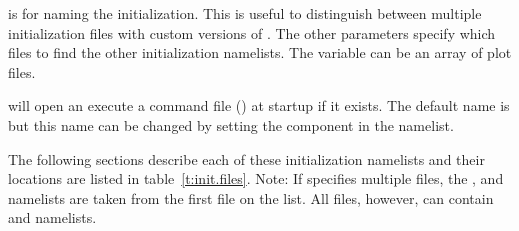  is for naming the initialization. This is useful to distinguish between multiple
initialization files with custom versions of \tao. The other parameters specify which files to find
the other initialization namelists. The  variable can be an array of plot files.

\tao will open an execute a command file () at startup if it exists.  The
default name is  but this name can be changed by setting the 
component in the  namelist.

The following sections describe each of these initialization namelists and their locations are
listed in table~\ref{t:init.files}. Note: If  specifies multiple files, the
,  and  namelists are taken from the
first file on the list. All files, however, can contain  and
 namelists.


